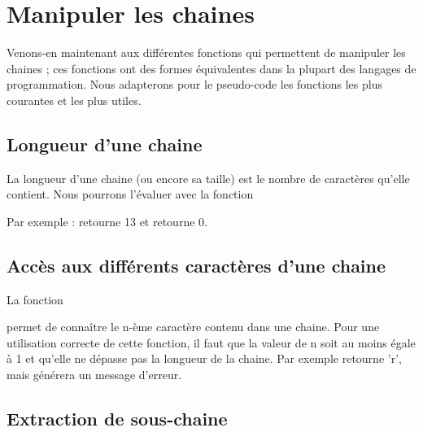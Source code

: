 \section{Manipuler les chaines}

	Venons-en maintenant aux différentes fonctions 
	qui permettent de manipuler les chaines ; 
	ces fonctions ont des formes équivalentes 
	dans la plupart des langages de programmation. 
	Nous adapterons pour le pseudo-code 
	les fonctions les plus courantes et les plus utiles.
	
	\subsection{Longueur d'une chaine}

		La longueur d'une chaine (ou encore sa taille) 
		est le nombre de caractères qu'elle contient. 
		Nous pourrons l'évaluer avec la fonction

		\begin{center}
		\end{center}
	
		Par exemple :  retourne 13 
		et  retourne 0.

	\subsection{Accès aux différents caractères d'une chaine}

		La fonction

		\begin{center}
		\end{center}

		permet de connaître le n-ème caractère contenu dans une chaine. 
		Pour une utilisation correcte de cette fonction, 
		il faut que la valeur de n soit au moins égale à 1 
		et qu'elle ne dépasse pas la longueur de la chaine. 
		Par exemple  retourne 'r', 
		mais  générera un message d'erreur.

	\subsection{Extraction de sous-chaine}

